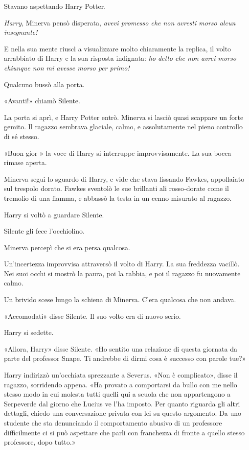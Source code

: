 Stavano aspettando Harry Potter.

\textit{Harry}, Minerva pensò disperata, \textit{avevi promesso che non avresti morso alcun insegnante!}

E nella sua mente riuscì a visualizzare molto chiaramente la replica, il volto arrabbiato di Harry e la sua risposta indignata: \textit{ho detto che non avrei morso chiunque non mi avesse morso per primo!}

Qualcuno bussò alla porta.

«Avanti!» chiamò Silente.

La porta si aprì, e Harry Potter entrò. Minerva si lasciò quasi scappare un forte gemito. Il ragazzo sembrava glaciale, calmo, e assolutamente nel pieno controllo di sé stesso.

«Buon gior-» la voce di Harry si interruppe improvvisamente. La sua bocca rimase aperta.

Minerva seguì lo sguardo di Harry, e vide che stava fissando Fawkes, appollaiato sul trespolo dorato. Fawkes sventolò le sue brillanti ali rosso-dorate come il tremolio di una fiamma, e abbassò la testa in un cenno misurato al ragazzo.

Harry si voltò a guardare Silente.

Silente gli fece l’occhiolino.

Minerva percepì che si era persa qualcosa.

Un’incertezza improvvisa attraversò il volto di Harry. La sua freddezza vacillò. Nei suoi occhi si mostrò la paura, poi la rabbia, e poi il ragazzo fu nuovamente calmo.

Un brivido scese lungo la schiena di Minerva. C’era qualcosa che non andava.

«Accomodati» disse Silente. Il suo volto era di nuovo serio.

Harry si sedette.

«Allora, Harry» disse Silente. «Ho sentito una relazione di questa giornata da parte del professor Snape. Ti andrebbe di dirmi cosa è successo con parole tue?»

Harry indirizzò un’occhiata sprezzante a Severus. «Non è complicato», disse il ragazzo, sorridendo appena. «Ha provato a comportarsi da bullo con me nello stesso modo in cui molesta tutti quelli qui a scuola che non appartengono a Serpeverde dal giorno che Lucius ve l’ha imposto. Per quanto riguarda gli altri dettagli, chiedo una conversazione privata con lei su questo argomento. Da uno studente che sta denunciando il comportamento abusivo di un professore difficilmente ci si può aspettare che parli con franchezza di fronte a quello stesso professore, dopo tutto.»

